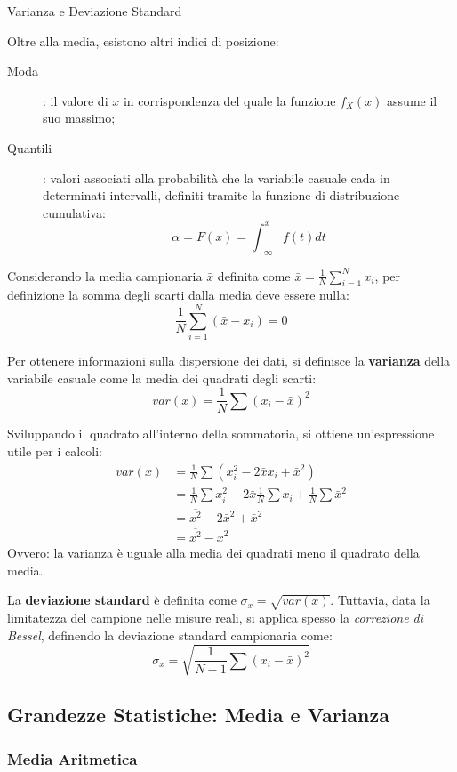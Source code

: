 \documentclass[openany,a4paper,12pt]{book}
\theoremstyle{remark}
\begin{document}
\begin{bressan}{Varianza e Deviazione Standard}

Oltre alla media, esistono altri indici di posizione:
\begin{description}
    \item[Moda]: il valore di $x$ in corrispondenza del quale la funzione $f_X(x)$ assume il suo massimo;
    \item[Quantili]: valori associati alla probabilità che la variabile casuale cada in determinati intervalli, definiti tramite la funzione di distribuzione cumulativa:
    \[ \alpha = F(x) = \int_{- \infty}^{x} f(t) dt\]
\end{description}

Considerando la media campionaria $\bar{x}$ definita come $\bar{x} = \frac{1}{N} \sum_{i=1}^{N} x_i$, per definizione la somma degli scarti dalla media deve essere nulla:
\[
\frac{1}{N}\sum_{i=1}^{N} (\bar{x}-x_i)=0
\]

Per ottenere informazioni sulla dispersione dei dati, si definisce la \textbf{varianza} della variabile casuale come la media dei quadrati degli scarti:
\[
var(x)= \frac{1}{N} \sum (x_i - \bar{x})^2
\]

Sviluppando il quadrato all'interno della sommatoria, si ottiene un'espressione utile per i calcoli:
\[
\begin{aligned}
var(x) &= \frac{1}{N} \sum (x_i^2 - 2 \bar{x} x_i + \bar{x}^2) \\
&= \frac{1}{N} \sum x_i^2 - 2 \bar{x} \frac{1}{N} \sum x_i + \frac{1}{N} \sum \bar{x}^2 \\
&= \overline{x^2} - 2\bar{x}^2 + \bar{x}^2 \\
&= \overline{x^2} - \bar{x}^2
\end{aligned}
\]
Ovvero: la varianza è uguale alla media dei quadrati meno il quadrato della media.

La \textbf{deviazione standard} è definita come $\sigma_x = \sqrt{var(x)}$. Tuttavia, data la limitatezza del campione nelle misure reali, si applica spesso la \textit{correzione di Bessel}, definendo la deviazione standard campionaria come:
\[
\sigma_x = \sqrt{\frac{1}{N-1} \sum (x_i - \bar{x})^2}
\]
\end{bressan}


\subsection*{Grandezze Statistiche: Media e Varianza}
\subsubsection{Media Aritmetica}
\end{document}
